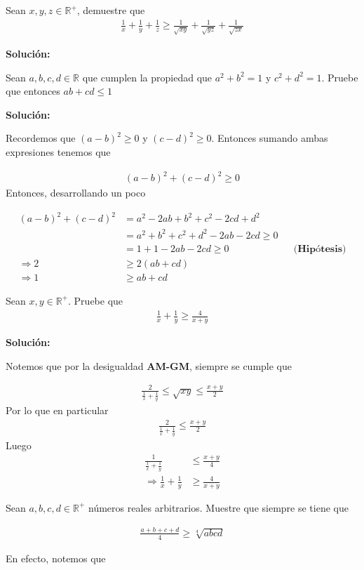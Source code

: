 \documentclass[12pt]{book}
\begin{document}
\begin{prob}{}{}
Sean $x,y,z \in \mathbb{R}^+$, demuestre que
\begin{align*}
    \frac{1}{x}+\frac{1}{y}+\frac{1}{z} \geq \frac{1}{\sqrt{xy}}+\frac{1}{\sqrt{yz}}+\frac{1}{\sqrt{zx}}
\end{align*}
\end{prob}
\textbf{Solución:}




\begin{prob}{}{}
    Sean $a,b,c,d \in \mathbb{R}$ que cumplen la propiedad que $a^2+b^2=1$ y $c^2+d^2=1$. Pruebe que entonces $ab+cd\leq1$ 
\end{prob}
\textbf{Solución:}

Recordemos que $(a-b)^2\geq0$ y $(c-d)^2\geq 0$. Entonces sumando ambas expresiones tenemos que 

\begin{align*}
    (a-b)^2+(c-d)^2 \geq 0
\end{align*}
Entonces, desarrollando un poco

\begin{align*}
    (a-b)^2+(c-d)^2&=a^2-2ab+b^2+c^2-2cd+d^2 \\
    &=a^2+b^2+c^2+d^2-2ab-2cd \geq 0 \\
     &=1+1-2ab-2cd \geq 0 && \textbf{(Hipótesis)} \\ 
    \Longrightarrow 2&\geq 2 (ab+cd) \\ 
   \Longrightarrow  1&\geq ab+cd
\end{align*}

\begin{prob}{}{}
    Sean $x,y \in \mathbb{R}^+$. Pruebe que 
\begin{align*}
    \frac{1}{x}+\frac{1}{y}\geq \frac{4}{x+y}
\end{align*}
\end{prob}
\textbf{Solución:}

Notemos que por la desigualdad \textbf{AM-GM}, siempre se cumple que

\begin{align*}
    \frac{2}{\frac{1}{x}+\frac{1}{y}}\leq\sqrt{xy}\leq\frac{x+y}{2}
\end{align*}
Por lo que en particular
\begin{align*}
  \frac{2}{\frac{1}{x}+\frac{1}{y}}\leq \frac{x+y}{2}
\end{align*}
Luego 
\begin{align*}
     \frac{1}{\frac{1}{x}+\frac{1}{y}}&\leq\frac{x+y}{4} \\
     \Longrightarrow \frac{1}{x}+\frac{1}{y}&\geq \frac{4}{x+y}
\end{align*}
\begin{prob}{}{}
    Sean $a,b,c,d \in \mathbb{R}^+$ números reales arbitrarios. Muestre que siempre se tiene que 

    \begin{align*}
        \frac{a+b+c+d}{4}\geq \sqrt[4]{abcd}
    \end{align*}
\end{prob}
En efecto, notemos que 
\end{document}
